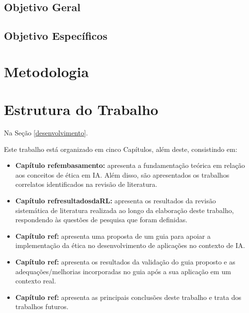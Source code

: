 \subsection{Objetivo Geral}


\subsection{Objetivo Específicos}


\section{Metodologia}


\section{Estrutura do Trabalho}
Na Seção \ref{desenvolvimento}.



Este trabalho está organizado em cinco Capítulos, além deste, consistindo em:
\begin{itemize}

\item \textbf{Capítulo refembasamento:} apresenta a fundamentação teórica em relação aos conceitos de ética em IA. Além disso, são apresentados os trabalhos correlatos identificados na revisão de literatura.

\item \textbf{Capítulo refresultadosdaRL:} apresenta os resultados da revisão sistemática de literatura realizada ao longo da elaboração deste trabalho, respondendo às questões de pesquisa que foram definidas.

\item \textbf{Capítulo ref:} apresenta uma proposta de um guia para apoiar a implementação da ética no desenvolvimento de aplicações no contexto de IA.


\item \textbf{Capítulo ref:} apresenta os resultados da validação do guia proposto e as adequações/melhorias incorporadas no guia após a sua aplicação em um contexto real. 

\item \textbf{Capítulo ref:} apresenta as principais conclusões deste trabalho e trata dos trabalhos futuros.

\end{itemize}